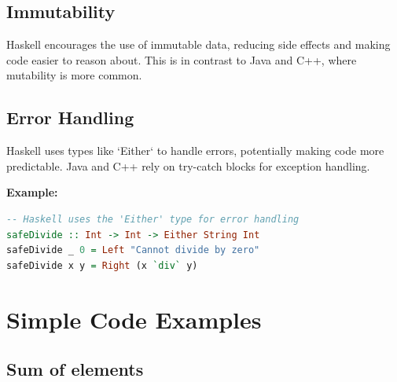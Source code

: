 \documentclass[a4paper, 10pt]{article}
\begin{document}
        \subsection{Immutability}
        Haskell encourages the use of immutable data, reducing side effects and making code easier to reason about. This is in contrast to Java and C++, where mutability is more common.

        \subsection{Error Handling}
        Haskell uses types like `Either` to handle errors, potentially making code more predictable. Java and C++ rely on try-catch blocks for exception handling.

        \textbf{Example:}
        \begin{lstlisting}[language=Haskell]
-- Haskell uses the 'Either' type for error handling
safeDivide :: Int -> Int -> Either String Int
safeDivide _ 0 = Left "Cannot divide by zero"
safeDivide x y = Right (x `div` y)
        \end{lstlisting}
        \newpage

	\section{Simple Code Examples}
    
        \subsection{Sum of elements}
    
\end{document}
